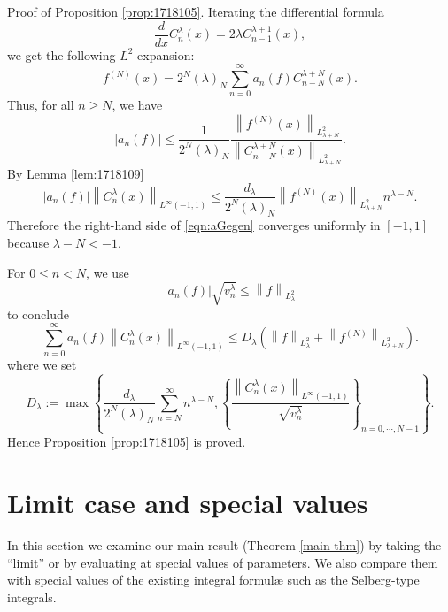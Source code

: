 \documentclass[12pt]{article}
\newcommand{\myabs}[1]{\left|#1\right|}
\numberwithin{equation}{section}
\newcommand{\mynorm}[1]{\left\|#1\right\|}
\newenvironment{proof*}[1]{\noindent\textbf{#1\ }}{\hspace*{\fill}$\Box$\medskip}
\newcommand{\mygrammarfootnote}[1]{}
\begin{document}
\begin{proof*}{Proof of Proposition \ref{prop:1718105}.}
	Iterating the differential formula\begin{equation*}
		\frac{d}{dx}C_n^\lambda(x)=2\lambda C^{\lambda+1}_{n-1}(x),
	\end{equation*}we {get} the following $L^2$-expansion:\begin{equation*}
		f^{(N)}(x)=2^N(\lambda)_N\displaystyle\sum_{n=0}^\infty a_n(f)C_{n-N}^{\lambda+N}(x).
	\end{equation*}Thus, for all $n\ge N$, we have\begin{equation*}
		\myabs{a_n(f)}\le\frac{1}{2^N(\lambda)_N}\frac{\mynorm{f^{(N)}(x)}_{L^2_{\lambda+N}}}{\mynorm{C^{\lambda+N}_{n-N}(x)}_{L^2_{\lambda+N}}}.
	\end{equation*}By Lemma \ref{lem:1718109}\begin{equation*}
		\myabs{a_n(f)}\mynorm{C^\lambda_n(x)}_{L^\infty(-1,1)}\le\frac{d_\lambda}{2^N(\lambda)_N}\mynorm{f^{(N)}(x)}_{L^2_{\lambda+N}}n^{\lambda-N}.
	\end{equation*}Therefore\mygrammarfootnote{comma here?} the right-hand side of \eqref{eqn:aGegen} converges uniformly in $[-1,1]$ because $\lambda-N<-1$.

	For $0\le n<N$, we use\begin{equation*}
		\myabs{a_n(f)}\sqrt{v_n^\lambda}\le\mynorm{f}_{L_\lambda^2}
	\end{equation*}to conclude\begin{equation*}
		\displaystyle\sum_{n=0}^\infty a_n(f)\mynorm{C_n^\lambda(x)}_{L^\infty(-1,1)}\le D_\lambda\left( \mynorm{f}_{L^2_\lambda}+\mynorm{f^{(N)}}_{L^2_{\lambda+N}} \right).
	\end{equation*}where we set\begin{equation*}
		D_\lambda:=\max\left\{ \frac{d_\lambda}{2^N(\lambda)_N}\displaystyle\sum_{n=N}^{\infty}n^{\lambda-N},\left\{ \frac{\mynorm{C_n^\lambda(x)}_{L^\infty(-1,1)}}{\sqrt{v_n^\lambda}} \right\}_{n=0,\cdots,N-1} \right\}.
	\end{equation*}Hence Proposition \ref{prop:1718105} is proved.
\end{proof*}
\section{Limit case and special values}\label{sec:4}

In this section we examine our main result (Theorem \ref{main-thm}) by taking
the ``limit'' or by evaluating at special values of parameters. We also
compare them with special values of the existing integral formul{\ae} such as
the Selberg-type integrals.
\end{document}
